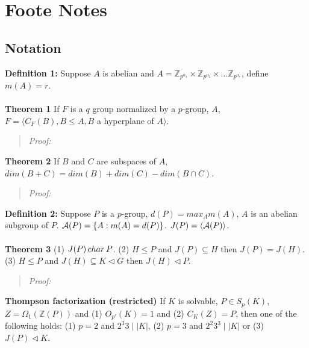 \chapter{Foote Notes}
\section{Notation}
{\bf Definition 1:}  Suppose $A$ is abelian and
$A= {\mathbb Z}_{p^{\alpha_1}} \times {\mathbb Z}_{p^{\alpha_2}} \times \ldots {\mathbb Z}_{p^{\alpha_r}}$, define
$m(A)=r$.
\\
\\
{\bf Theorem 1} If $F$ is a $q$ group normalized by a $p$-group, $A$, $F= \langle C_F(B), B \leq A, B$ a hyperplane of $A \rangle$.
\begin{quote}
\emph{Proof:}  
\end{quote}
{\bf Theorem 2} If $B$ and $C$ are subspaces of $A$, $dim(B+C)= dim(B) + dim(C)- dim(B \cap C)$.
\begin{quote}
\emph{Proof:}  
\end{quote}
{\bf Definition 2:}  Suppose $P$ is a $p$-group, $d(P) = max_{A} m(A)$, $A$ is an abelian subgroup of $P$. 
${\cal A}(P)= \{ A: m(A)=d(P) \}$.  $J(P) = \langle {\cal A}(P) \rangle$.
\\
\\
{\bf Theorem 3} (1) $J(P) \thinspace char \thinspace P$.
(2) $H \leq P$ and $J(P) \subseteq H$ then $J(P)= J(H)$.
(3) $H \leq P$ and $J(H) \subseteq K \lhd G$ then $J(H) \lhd P$.
\begin{quote}
\emph{Proof:}  
\end{quote}
{\bf Thompson factorization (restricted)} If $K$ is solvable, $P \in S_p(K)$, $Z= \Omega_1({\mathbb Z}(P))$ and 
(1) $O_{p'}(K) = 1$ and (2) $C_K(Z)=P$, then one of the following holds: (1) $p=2$ and $ 2^3 3 \mid |K|$, (2)
$p=3$ and $2^2 3^3 \mid |K|$ or (3) $J(P) \lhd K$.
